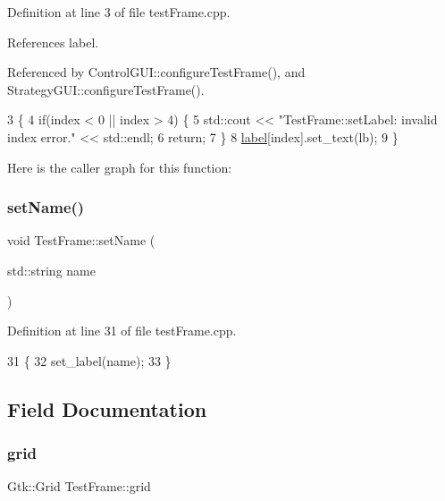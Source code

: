 Definition at line 3 of file test\+Frame.\+cpp.



References label.



Referenced by Control\+G\+U\+I\+::configure\+Test\+Frame(), and Strategy\+G\+U\+I\+::configure\+Test\+Frame().


\begin{DoxyCode}
3                                                 \{
4     \textcolor{keywordflow}{if}(index < 0 || index > 4) \{
5       std::cout << \textcolor{stringliteral}{"TestFrame::setLabel: invalid index error."} << std::endl;
6         \textcolor{keywordflow}{return};
7     \}
8     \hyperlink{class_test_frame_a0fb8c663f048dc69899409a61bd22025}{label}[index].set\_text(lb);
9 \}
\end{DoxyCode}
Here is the caller graph for this function\+:
\mbox{\label{class_test_frame_a1b1a37526e0ce6c7e48babba09fdbdd5}} 
\subsubsection{\texorpdfstring{set\+Name()}{setName()}}
{\footnotesize\ttfamily void Test\+Frame\+::set\+Name (\begin{DoxyParamCaption}\item[{std\+::string}]{name }\end{DoxyParamCaption})}



Definition at line 31 of file test\+Frame.\+cpp.


\begin{DoxyCode}
31                                       \{
32     set\_label(name);
33 \}
\end{DoxyCode}


\subsection{Field Documentation}
\mbox{\label{class_test_frame_a8db1fcde1fac654bd8e6bd947da2dd10}} 
\subsubsection{\texorpdfstring{grid}{grid}}
{\footnotesize\ttfamily Gtk\+::\+Grid Test\+Frame\+::grid\hspace{0.3cm}{\ttfamily [private]}}



